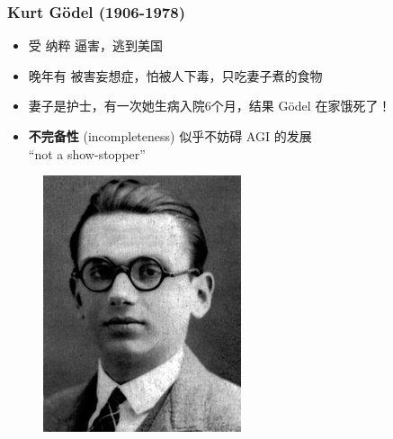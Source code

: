\documentclass[17pt]{beamer}
\begin{document}
\begin{frame}
\frametitle{Kurt G\"{o}del (1906-1978)}
\fontsize{14}{14}\selectfont
\begin{minipage}[t]{0.62\linewidth}
	\begin{itemize}
		\item 受 纳粹 逼害，逃到美国
		\item 晚年有 被害妄想症，怕被人下毒，只吃妻子煮的食物
		\item 妻子是护士，有一次她生病入院6个月，结果 G\"{o}del 在家{\color{red}饿死}了！
		\item \textbf{不完备性} (incompleteness) 似乎不妨碍 AGI 的发展 \\
			\vspace{0.5em} \textrm{``not a show-stopper''}
	\end{itemize}
\end{minipage}
\hfill
\begin{minipage}[t]{0.35\linewidth}
	\begin{figure}[H]
		\includegraphics[scale=0.5]{Godel.png}
	\end{figure}
\end{minipage}
\end{frame}
\end{document}
